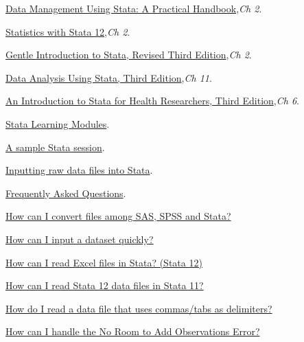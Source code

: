 \documentclass{article}
\begin{document}
\begin{compactitem}
\item \href{http://www.stata-press.com/books/data-management-using-stata/}{Data Management Using Stata: A Practical Handbook},\textit{Ch 2}.
\item \href{http://www.stata.com/bookstore/statistics-with-stata/}{Statistics with Stata 12},\textit{Ch 2}.
\item \href{http://statapress.com/books/gentle-introduction-to-stata/}{Gentle Introduction to Stata, Revised Third Edition},\textit{Ch 2}.
\item \href{http://statapress.com/books/data-analysis-using-stata/}{Data Analysis Using Stata, Third Edition},\textit{Ch 11}.
\item \href{http://statapress.com/books/introduction-stata-health-researchers/}{An Introduction to Stata for Health Researchers, Third Edition},\textit{Ch 6}.
\item \href{http://www.ats.ucla.edu/stat/stata/modules/}{Stata Learning Modules}.
\begin{compactitem}
\item \href{http://www.stata.com/capabilities/session.html}{A sample Stata session}.
\item \href{http://www.ats.ucla.edu/stat/stata/modules/input.htm}{Inputting raw data files into Stata}.
\end{compactitem}
\item \href{http://www.ats.ucla.edu/stat/stata/faq/default.htm}{Frequently Asked Questions}.
\begin{compactitem}
\item \href{http://www.ats.ucla.edu/stat/stata/faq/convert_pkg.htm}{How can I convert files among SAS, SPSS and Stata?}
\item \href{http://www.ats.ucla.edu/stat/stata/faq/inputquick.htm}{How can I input a dataset quickly?}
\item \href{http://www.ats.ucla.edu/stat/stata/faq/read_excel.htm}{How can I read Excel files in Stata? (Stata 12)}
\item \href{http://www.ats.ucla.edu/stat/stata/faq/stata12in11.htm}{How can I read Stata 12 data files in Stata 11?}
\item \href{http://www.ats.ucla.edu/stat/stata/faq/readcommatab.htm}{How do I read a data file that uses commas/tabs as delimiters?}
\item \href{http://www.ats.ucla.edu/stat/stata/faq/setmemory.htm}{How can I handle the No Room to Add Observations Error?}
\end{compactitem}

\end{compactitem}
\end{document}
